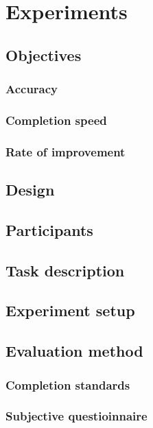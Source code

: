 \chapter{Experiments}
\label{ch:experiments}
\section{Objectives}
  \subsection{Accuracy}
  \subsection{Completion speed}
  \subsection{Rate of improvement}
\section{Design}
\section{Participants}
\section{Task description}
\section{Experiment setup}
\section{Evaluation method}
  \subsection{Completion standards}
  \subsection{Subjective questioinnaire}
